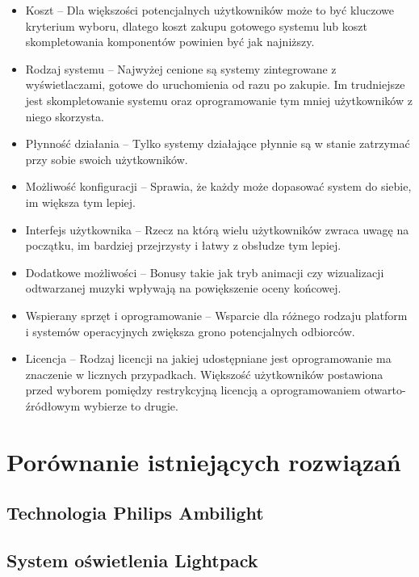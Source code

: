 \documentclass[12pt]{report}
\begin{document}
\begin{itemize}
	\item Koszt -- Dla większości potencjalnych użytkowników może to być kluczowe kryterium wyboru, dlatego koszt zakupu gotowego systemu lub koszt skompletowania komponentów powinien być jak najniższy.
	\item Rodzaj systemu -- Najwyżej cenione są systemy zintegrowane z wyświetlaczami, gotowe do uruchomienia od razu po zakupie. Im trudniejsze jest skompletowanie systemu oraz oprogramowanie tym mniej użytkowników z niego skorzysta.
	\item Płynność działania -- Tylko systemy działające płynnie są w stanie zatrzymać przy sobie swoich użytkowników.
	\item Możliwość konfiguracji -- Sprawia, że każdy może dopasować system do siebie, im większa tym lepiej.
	\item Interfejs użytkownika -- Rzecz na którą wielu użytkowników zwraca uwagę na początku, im bardziej przejrzysty i łatwy z obsłudze tym lepiej.
	\item Dodatkowe możliwości -- Bonusy takie jak tryb animacji czy wizualizacji odtwarzanej muzyki wpływają na powiększenie oceny końcowej.
	\item Wspierany sprzęt i oprogramowanie -- Wsparcie dla różnego rodzaju platform i systemów operacyjnych zwiększa grono potencjalnych odbiorców.
	\item Licencja -- Rodzaj licencji na jakiej udostępniane jest oprogramowanie ma znaczenie w licznych przypadkach. Większość użytkowników postawiona przed wyborem pomiędzy restrykcyjną licencją a oprogramowaniem otwarto-źródłowym wybierze to drugie.
\end{itemize} 

\section{Porównanie istniejących rozwiązań}

\subsection{Technologia Philips Ambilight}


\subsection{System oświetlenia Lightpack}

\end{document}
